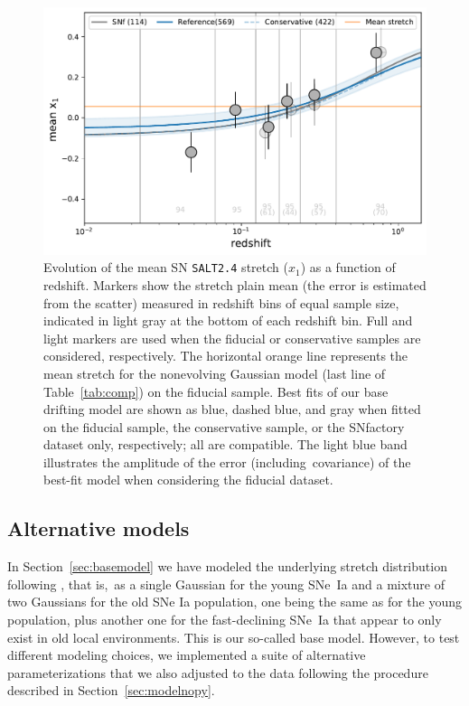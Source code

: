 \documentclass[]{aa}
\begin{document}
\begin{figure}
    \centering
    \includegraphics[width=0.7\linewidth]{Article_figures/stretchevol_all_vs_snf-mean.pdf}
    \caption{Evolution of the mean SN \textsc{\texttt{SALT2.4}} stretch ($x_1$)
        as a function of redshift. Markers show the stretch plain mean (the
        error is estimated from the scatter) measured in redshift bins of equal
        sample size, indicated in light gray at the bottom of each redshift bin.
        Full and light markers are used when the fiducial or conservative
        samples are considered, respectively. The horizontal orange line
        represents the mean stretch for the nonevolving Gaussian model (last
        line of Table~\ref{tab:comp}) on the fiducial sample. Best fits of our
        base drifting model are shown as blue, dashed blue, and gray when fitted
        on the fiducial sample, the conservative sample, or the SNfactory
        dataset only, respectively; all are compatible. The light blue band
        illustrates the amplitude of the error (including\ covariance) of the
        best-fit model when considering the fiducial dataset.}
    \label{fig:modelall}
\end{figure}

\subsection{Alternative models}\label{sec:othermodel}

In Section~\ref{sec:basemodel} we have modeled the underlying stretch
distribution following \cite{rigault2020}, that is,\ as a single Gaussian for
the young SNe~Ia and a mixture of two Gaussians for the old SNe Ia population,
one being the same as for the young population, plus another one for the
fast-declining SNe~Ia that appear to only exist in old local environments. This
is our so-called base model. However, to test different modeling choices, we
implemented a suite of alternative parameterizations that we also adjusted to
the data following the procedure described in Section~\ref{sec:modelnopy}. 
\end{document}
